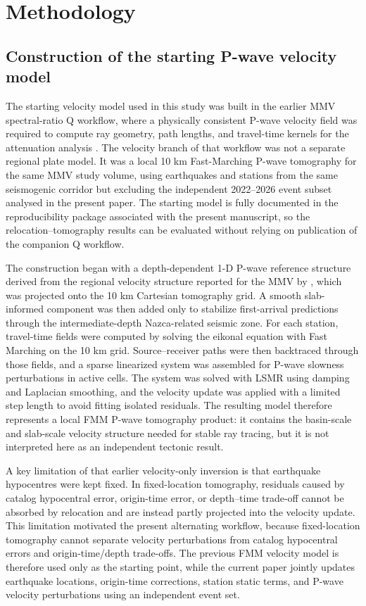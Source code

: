 \documentclass[review,authoryear]{elsarticle}
\begin{document}
\section{Methodology}
\subsection{Construction of the starting P-wave velocity model}
The starting velocity model used in this study was built in the earlier MMV spectral-ratio Q workflow, where a physically consistent P-wave velocity field was required to compute ray geometry, path lengths, and travel-time kernels for the attenuation analysis \citep{MMVFMMVelocityAttenuationInPrep}. The velocity branch of that workflow was not a separate regional plate model. It was a local 10 km Fast-Marching P-wave tomography for the same MMV study volume, using earthquakes and stations from the same seismogenic corridor but excluding the independent 2022--2026 event subset analysed in the present paper. The starting model is fully documented in the reproducibility package associated with the present manuscript, so the relocation--tomography results can be evaluated without relying on publication of the companion Q workflow.

The construction began with a depth-dependent 1-D P-wave reference structure derived from the regional velocity structure reported for the MMV by \citet{Londono2020Velocity}, which was projected onto the 10 km Cartesian tomography grid. A smooth slab-informed component was then added only to stabilize first-arrival predictions through the intermediate-depth Nazca-related seismic zone. For each station, travel-time fields were computed by solving the eikonal equation with Fast Marching on the 10 km grid. Source--receiver paths were then backtraced through those fields, and a sparse linearized system was assembled for P-wave slowness perturbations in active cells. The system was solved with LSMR using damping and Laplacian smoothing, and the velocity update was applied with a limited step length to avoid fitting isolated residuals. The resulting model therefore represents a local FMM P-wave tomography product: it contains the basin-scale and slab-scale velocity structure needed for stable ray tracing, but it is not interpreted here as an independent tectonic result.

A key limitation of that earlier velocity-only inversion is that earthquake hypocentres were kept fixed. In fixed-location tomography, residuals caused by catalog hypocentral error, origin-time error, or depth--time trade-off cannot be absorbed by relocation and are instead partly projected into the velocity update. This limitation motivated the present alternating workflow, because fixed-location tomography cannot separate velocity perturbations from catalog hypocentral errors and origin-time/depth trade-offs. The previous FMM velocity model is therefore used only as the starting point, while the current paper jointly updates earthquake locations, origin-time corrections, station static terms, and P-wave velocity perturbations using an independent event set.
\end{document}
